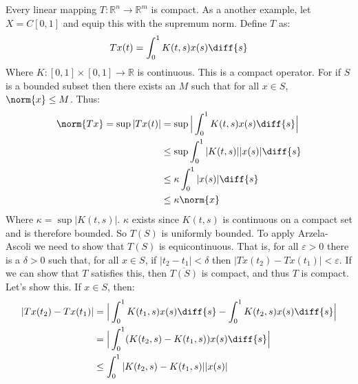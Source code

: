             \begin{example}
                Every linear mapping
                $T:\mathbb{R}^{n}\rightarrow\mathbb{R}^{m}$
                is compact.
                As a another example, let
                $X=C[0,1]$ and equip this with the supremum norm.
                Define $T$ as:
                \begin{equation*}
                    Tx(t)=\int_{0}^{1}K(t,s)x(s)\diff{s}
                \end{equation*}
                Where $K:[0,1]\times[0,1]\rightarrow\mathbb{R}$
                is continuous. This is a compact operator. For if
                $S$ is a bounded subset then there exists
                an $M$ such
                that for all $x\in{S}$, $\norm{x}\leq{M}$. Thus:
                \begin{align*}
                    \norm{Tx}=\sup|Tx(t)|
                    &=\sup\Big|\int_{0}^{1}
                    K(t,s)x(s)\diff{s}\Big|\\
                    &\leq\sup\int_{0}^{1}
                    |K(t,s)||x(s)|\diff{s}\\
                    &\leq\kappa\int_{0}^{1}|x(s)|\diff{s}\\
                    &\leq\kappa\norm{x}
                \end{align*}
                Where $\kappa=\sup|K(t,s)|$. $\kappa$ exists
                since $K(t,s)$ is continuous on a compact
                set and is therefore
                bounded. So $T(S)$ is uniformly bounded. To apply
                Arzela-Ascoli we need to show that
                $T(S)$ is equicontinuous. That is, for all
                $\varepsilon>0$ there is a $\delta>0$ such that,
                for all $x\in{S}$, if $|t_{2}-t_{1}|<\delta$
                then $|Tx(t_{2})-Tx(t_{1})|<\varepsilon$. If we
                can show that $T$ satisfies this, then
                $\overline{T(S)}$ is compact,
                and thus $T$ is compact.
                Let's show this. If $x\in{S}$, then:
                \begin{align*}
                    |Tx(t_{2})-Tx(t_{1})|
                    &=\Big|\int_{0}^{1}K(t_{1},s)x(s)\diff{s}
                    -\int_{0}^{1}K(t_{2},s)x(s)\diff{s}\Big|\\
                    &=\Big|\int_{0}^{1}(K(t_{2},s)-
                    K(t_{1},s))x(s)\diff{s}\Big|\\
                    &\leq
                    \int_{0}^{1}|K(t_{2},s)-K(t_{1},s)||x(s)|

\end{align*}
\end{example}
